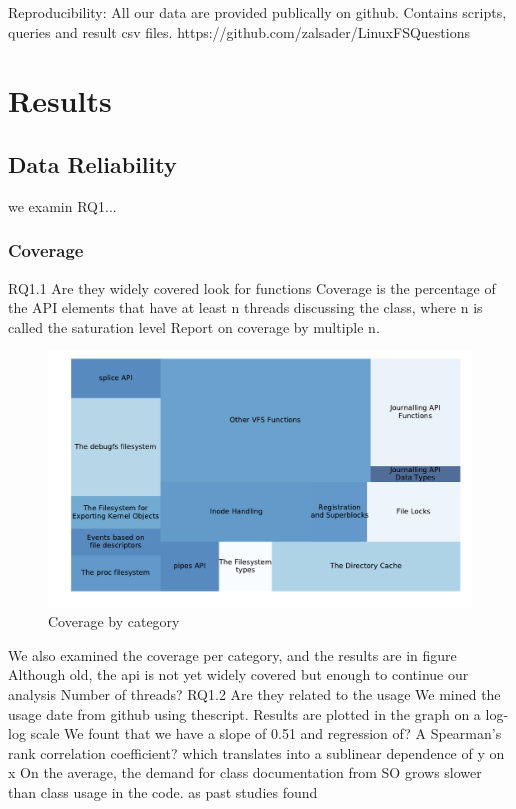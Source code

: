 Reproducibility:
All our data are provided publically on github. Contains scripts, queries and result csv files.
https://github.com/zalsader/LinuxFSQuestions

\section{Results}
\subsection{Data Reliability}
we examin RQ1...
\subsubsection{Coverage}
RQ1.1
Are they widely covered
look for functions
Coverage is the percentage of the API elements that have at least n threads discussing
the class, where n is called the saturation level
Report on coverage by multiple n. %
\begin{figure}
  \includegraphics{scripts/figures/1-1-coveragebycategory.pdf}
  \caption{Coverage by category}
  \label{fig:covbycategory}
\end{figure}

We also examined the coverage per category, and the results are in figure
Although old, the api is not yet widely covered
but enough to continue our analysis
Number of threads? %
RQ1.2
Are they related to the usage
We mined the usage date from github using thescript.
Results are plotted in the graph on a log-log scale
We fount that we have a slope of 0.51 and regression of? %
A Spearman’s rank correlation coefficient?
which translates into a sublinear dependence of y on x
On the average, the demand for class documentation from SO grows slower
than class usage in the code. as past studies found


